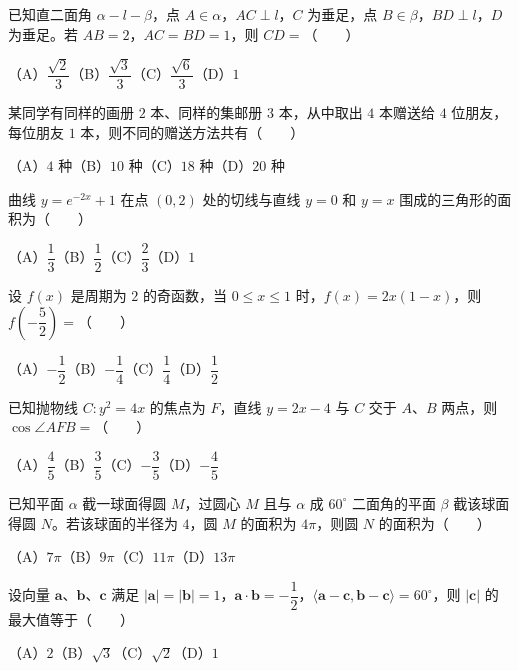 \begin{question}
已知直二面角 $\alpha-l-\beta$，点 $A\in\alpha$，$AC\perp l$，$C$ 为垂足，点 $B\in\beta$，$BD\perp l$，$D$ 为垂足。若 $AB=2$，$AC=BD=1$，则 $CD=$\mbox{（　　）}

（A）$\dfrac{\sqrt2}{3}$\quad（B）$\dfrac{\sqrt3}{3}$\quad（C）$\dfrac{\sqrt6}{3}$\quad（D）$1$

\end{question}
\begin{question}
某同学有同样的画册 $2$ 本、同样的集邮册 $3$ 本，从中取出 $4$ 本赠送给 $4$ 位朋友，每位朋友 $1$ 本，则不同的赠送方法共有\mbox{（　　）}

（A）$4$ 种\quad（B）$10$ 种\quad（C）$18$ 种\quad（D）$20$ 种

\end{question}
\begin{question}
曲线 $y=e^{-2x}+1$ 在点 $(0,2)$ 处的切线与直线 $y=0$ 和 $y=x$ 围成的三角形的面积为\mbox{（　　）}

（A）$\dfrac13$\quad（B）$\dfrac12$\quad（C）$\dfrac23$\quad（D）$1$

\end{question}
\begin{question}
设 $f(x)$ 是周期为 $2$ 的奇函数，当 $0\leq x\leq1$ 时，$f(x)=2x(1-x)$，则 $f\left(-\dfrac52\right)=$\mbox{（　　）}

（A）$-\dfrac12$\quad（B）$-\dfrac14$\quad（C）$\dfrac14$\quad（D）$\dfrac12$

\end{question}
\begin{question}
已知抛物线 $C:y^2=4x$ 的焦点为 $F$，直线 $y=2x-4$ 与 $C$ 交于 $A\text{、}B$ 两点，则 $\cos\angle AFB=$\mbox{（　　）}

（A）$\dfrac45$\quad（B）$\dfrac35$\quad（C）$-\dfrac35$\quad（D）$-\dfrac45$

\end{question}
\begin{question}
已知平面 $\alpha$ 截一球面得圆 $M$，过圆心 $M$ 且与 $\alpha$ 成 $60^\circ$ 二面角的平面 $\beta$ 截该球面得圆 $N$。若该球面的半径为 $4$，圆 $M$ 的面积为 $4\pi$，则圆 $N$ 的面积为\mbox{（　　）}

（A）$7\pi$\quad（B）$9\pi$\quad（C）$11\pi$\quad（D）$13\pi$

\end{question}
\begin{question}
设向量 $\boldsymbol a\text{、}\boldsymbol b\text{、}\boldsymbol c$ 满足 $|\boldsymbol a|=|\boldsymbol b|=1$，$\boldsymbol a\cdot\boldsymbol b=-\dfrac12$，$\langle\boldsymbol a-\boldsymbol c,\boldsymbol b-\boldsymbol c\rangle=60^\circ$，则 $|\boldsymbol c|$ 的最大值等于\mbox{（　　）}

（A）$2$\quad（B）$\sqrt3$\quad（C）$\sqrt2$\quad（D）$1$

\end{question}

